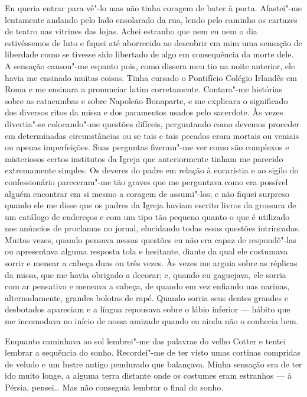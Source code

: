 Eu queria entrar para vê"-lo mas não tinha coragem de bater à porta.  Afastei"-me
lentamente andando pelo lado ensolarado da rua, lendo pelo caminho os cartazes
de teatro nas vitrines das lojas.  Achei estranho que nem eu nem o dia
estivéssemos de luto e fiquei até aborrecido ao descobrir em mim uma sensação
de liberdade como se tivesse sido libertado de algo em consequência da morte
dele.  A sensação causou"-me espanto pois, como dissera meu tio na noite
anterior, ele havia me ensinado muitas coisas.  Tinha cursado o Pontifício
Colégio Irlandês em Roma e me ensinara a pronunciar latim corretamente.
Contara"-me histórias sobre as catacumbas e sobre Napoleão Bonaparte, e me
explicara o significado dos diversos ritos da missa e dos paramentos usados
pelo sacerdote.  Às vezes divertia"-se colocando"-me questões difíceis,
perguntando como devemos proceder em determinadas circunstâncias ou se tais e
tais pecados eram mortais ou veniais ou apenas imperfeições.  Suas perguntas
fizeram"-me ver como são complexos e misteriosos certos institutos da Igreja que
anteriormente tinham me parecido extremamente simples.  Os deveres do padre em
relação à eucaristia e ao sigilo do confessionário pareceram"-me tão graves que
me perguntava como era possível alguém encontrar em si mesmo a coragem de
assumi"-los; e não fiquei surpreso quando ele me disse que os padres da Igreja
haviam escrito livros da grossura de um catálogo de endereços e com um tipo tão
pequeno quanto o que é utilizado nos anúncios de proclamas no jornal,
elucidando todas essas questões intrincadas.  Muitas vezes, quando pensava
nessas questões eu não era capaz de respondê"-las ou apresentava alguma resposta
tola e hesitante, diante da qual ele costumava sorrir e menear a cabeça duas ou
três vezes.  Às vezes me arguia sobre as réplicas da missa, que me havia
obrigado a decorar; e, quando eu gaguejava, ele sorria com ar pensativo e
meneava a cabeça, de quando em vez enfiando nas narinas, alternadamente,
grandes bolotas de rapé.  Quando sorria seus dentes grandes e desbotados
apareciam e a língua repousava sobre o lábio inferior --- hábito que me
incomodava no início de nossa amizade quando eu ainda não o conhecia bem.

Enquanto caminhava ao sol lembrei"-me das palavras do velho Cotter e tentei
lembrar a sequência do sonho.  Recordei"-me de ter visto umas cortinas compridas
de veludo e um lustre antigo pendurado que balançava.  Minha sensação era de
ter ido muito longe, a alguma terra distante onde os costumes eram estranhos
--- à Pérsia, pensei\ldots{}  Mas não conseguia lembrar o final do sonho.

